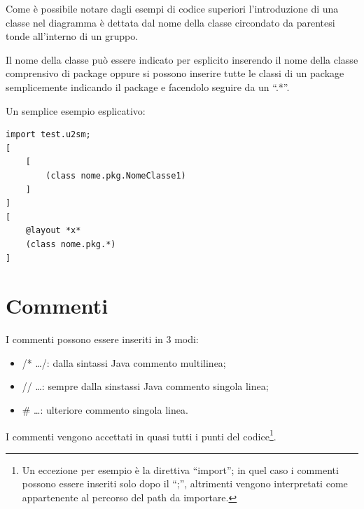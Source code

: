 Come è possibile notare dagli esempi di codice superiori l'introduzione di una
classe nel diagramma è dettata dal nome della classe circondato da parentesi
tonde all'interno di un gruppo.

Il nome della classe può essere indicato per esplicito inserendo il nome della
classe comprensivo di package oppure si possono inserire tutte le classi di un
package semplicemente indicando il package e facendolo seguire da un ``.*''.

Un semplice esempio esplicativo:

\begin{lstlisting}[caption={Diagramma decorato di attributi}, style={layout}] 
import test.u2sm;
[
	[	
		(class nome.pkg.NomeClasse1)
	]
]
[
	@layout *x*
	(class nome.pkg.*)
]
\end{lstlisting}

\section{Commenti}

I commenti possono essere inseriti in 3 modi:
\begin{itemize}
  \item /* \ldots */: dalla sintassi Java commento multilinea;
  \item // \ldots: sempre dalla sinstassi Java commento singola linea;
  \item \# \ldots: ulteriore commento singola linea.
\end{itemize}


I commenti vengono accettati in quasi tutti i punti del codice\footnote{Un
eccezione per esempio è la direttiva ``import''; in quel caso i commenti possono essere
inseriti solo dopo il ``;'', altrimenti vengono interpretati come appartenente
al percorso del path da importare.}.

